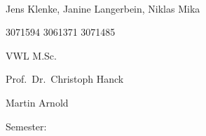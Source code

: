 \documentclass[11pt,a4paper]{article}
\begin{document}
\begin{titlepage}
\begin{center}
  \vspace{0.75cm}
  \large{}\\
  \vspace{0.5cm}
  Jens Klenke, Janine Langerbein, Niklas Mika\\
  \end{center}
  \vspace{4cm}

  \noindent\begin{minipage}[t]{0.5\textwidth}
  \end{minipage}
  \begin{minipage}[t]{0.7\textwidth}
  \hspace{1cm}3071594 \textbar{} 3061371 \textbar{} 3071485
  \end{minipage}

  \noindent\begin{minipage}[t]{0.5\textwidth}
  \end{minipage}
  \begin{minipage}[t]{0.7\textwidth}
  \hspace{1cm}VWL M.Sc.
  \end{minipage}

  \noindent\begin{minipage}[t]{0.5\textwidth}
  \end{minipage}
  \begin{minipage}[t]{0.7\textwidth}
  \hspace{1cm}Prof.~Dr.~Christoph Hanck
  \end{minipage}

  \noindent\begin{minipage}[t]{0.5\textwidth}
  \end{minipage}
  \begin{minipage}[t]{0.7\textwidth}
  \hspace{1cm}Martin Arnold
  \end{minipage}

  \noindent\begin{minipage}[t]{0.5\textwidth}
  Semester:
  \end{minipage}
  \begin{minipage}[t]{0.7\textwidth}
  \hspace{1cm}
  \end{minipage}


\end{titlepage}
\end{document}
